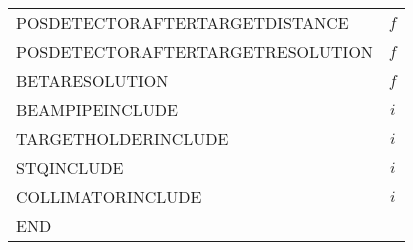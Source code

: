\documentclass[12pt]{book}
\begin{document}
\begin{table}
\begin{tabular}{|l||c|}
    POSDETECTORAFTERTARGETDISTANCE   & $f$             \\
    POSDETECTORAFTERTARGETRESOLUTION & $f$             \\
    BETARESOLUTION                   & $f$             \\
    BEAMPIPEINCLUDE                  & $i$             \\
    TARGETHOLDERINCLUDE              & $i$             \\
    STQINCLUDE                       & $i$             \\
    COLLIMATORINCLUDE                & $i$             \\
    END                              &                 \\
    \hline
  \end{tabular}
\end{table}
\end{document}
